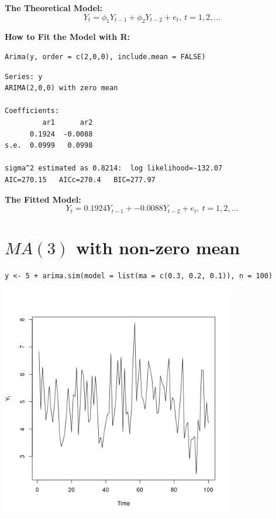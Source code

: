 \documentclass[12pt]{article}
\begin{document}
\noindent
\textbf{The Theoretical Model:} 
\[
Y_{t} = \phi_{1}Y_{t - 1} + \phi_{2}Y_{t - 2}  + e_{t},\ t = 1,2,\ldots
\]

\noindent
\textbf{How to Fit the Model with R:}


\begin{verbatim}
Arima(y, order = c(2,0,0), include.mean = FALSE)
\end{verbatim}




\begin{verbatim}
Series: y 
ARIMA(2,0,0) with zero mean     

Coefficients:
         ar1      ar2
      0.1924  -0.0088
s.e.  0.0999   0.0998

sigma^2 estimated as 0.8214:  log likelihood=-132.07
AIC=270.15   AICc=270.4   BIC=277.97
\end{verbatim}

\noindent
\textbf{The Fitted Model:} 
\[
Y_{t} =  0.1924 Y_{t - 1} +  -0.0088 Y_{t - 2}  +  e_{t},\ t = 1,2,\ldots
\]
\section*{$MA(3)$ with non-zero mean}
\label{sec-3}


\begin{verbatim}
y <- 5 + arima.sim(model = list(ma = c(0.3, 0.2, 0.1)), n = 100)
\end{verbatim}





\includegraphics[width=4.0in]{img/ma3nzm.png}
\end{document}
